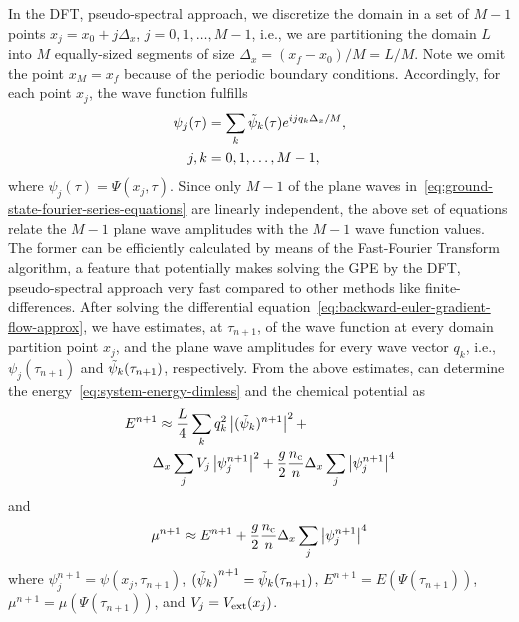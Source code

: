 \documentclass[twocolumn,showpacs,showkeys,preprintnumbers,superscriptaddress, pra, 10pt, aps]{revtex4-2}
\begin{document}
In the DFT, pseudo-spectral approach, we discretize the domain in a set of $M-1$ points $x_j = x_0 +
  j \Delta_x$, $j = 0, 1, \ldots, M-1$, i.e., we are partitioning the domain $L$ into $M$
equally-sized segments of size $\Delta_x = (x_f - x_0) / M = L / M$. Note we omit the point $x_M =
  x_f$ because of the periodic boundary conditions. Accordingly, for each point $x_j$, the wave
function fulfills
%
\begin{align}
  \label{eq:ground-state-fourier-series-equations}
  \psi_j(\tau) & = \sum_{k} \tilde{\psi}_k(\tau) e^{i j q_k \Delta_x / M}, \\
  \nonumber
  j, k         & = 0, 1, \ldots, M-1,
\end{align}
%
where $\psi_j(\tau) = \Psi(x_j, \tau)$. Since only $M-1$ of the plane waves
in~\eqref{eq:ground-state-fourier-series-equations} are linearly independent, the above set of
equations relate the $M-1$ plane wave amplitudes with the $M-1$ wave function values. The former can
be efficiently calculated by means of the Fast-Fourier Transform algorithm, a feature that
potentially makes solving the GPE by the DFT, pseudo-spectral approach very fast compared to other
methods like finite-differences.
After solving the differential equation~\eqref{eq:backward-euler-gradient-flow-approx}, we have
estimates, at $\tau_{n + 1}$, of the wave function at every domain partition point $x_j$, and the
plane wave amplitudes for every wave vector $q_k$, i.e., $\psi_j(\tau_{n+1})$ and
$\tilde{\psi}_k(\tau_{n+1})$, respectively. From the above estimates, can determine the
energy~\eqref{eq:system-energy-dimless} and the chemical potential as
%
\begin{align}
  \nonumber
   & E^{n + 1} \approx \frac{L}{4} \sum_{k} q_k^2 \left| (\tilde{\psi}_k)^{n + 1} \right|^2 +                                                  \\
   & \qquad  \Delta_x \sum_{j} V_j \left| \psi_j^{n+1} \right|^2 + \frac{g}{2} \frac{n_{\mathrm{c}}}{n} \Delta_x \sum_{j} \left|\psi_j^{n+1}\right|^4
\end{align}
%
and
%
\begin{equation}
  \mu^{n+1} \approx E^{n+1} + \frac{g}{2} \frac{n_{\mathrm{c}}}{n} \Delta_x \sum_{j} \left|\psi_j^{n+1}\right|^4
\end{equation}
%
where $\psi_j^{n+1} = \psi(x_j, \tau_{n+1})$, ${(\tilde{\psi}_k)}^{n+1} = \tilde{\psi}_k(\tau_{n+1})$, $E^{n + 1} = E(\Psi(\tau_{n+1}))$, $\mu^{n+1} = \mu(\Psi(\tau_{n+1}))$, and $V_{j} = V_\mathrm{ext}(x_j)$.
\end{document}
